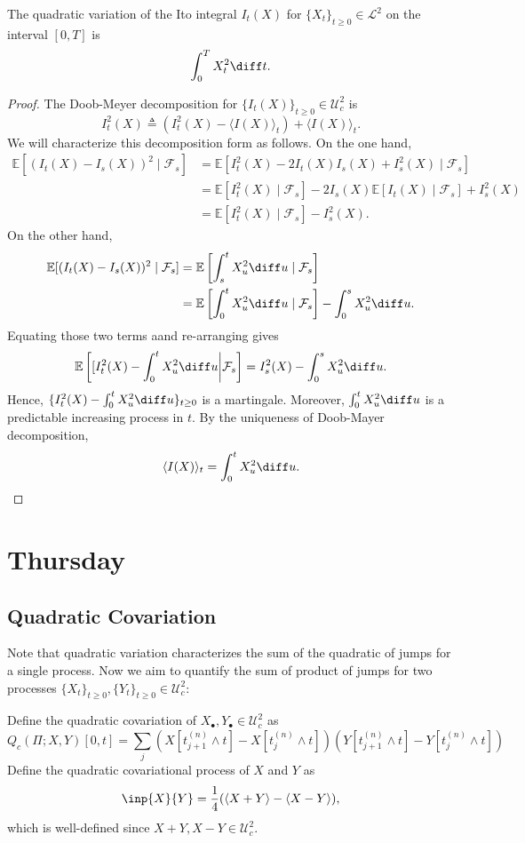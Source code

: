 \begin{theorem}
The quadratic variation of the Ito integral $I_t(X)$ for $\{X_t\}_{t\ge0}\in\mathcal{L}^2$ on the interval $[0,T]$ is
\[
\int_0^TX_t^2\diff t.
\]
\end{theorem}
\begin{proof}
The Doob-Meyer decomposition for $\{I_t(X)\}_{t\ge0}\in\mathcal{U}_c^2$ is
\[
I_t^2(X)\triangleq (I_t^2(X)-\langle I(X)\rangle_t) + \langle I(X)\rangle_t.
\]
We will characterize this decomposition form as follows.
On the one hand,
\begin{align*}
\mathbb{E}[(I_t(X)-I_s(X))^2\mid\mathcal{F}_s]&=\mathbb{E}[I_t^2(X)-2I_t(X)I_s(X)+I_s^2(X)\mid\mathcal{F}_s]\\
&=\mathbb{E}[I_t^2(X)\mid \mathcal{F}_s]-2I_s(X)\mathbb{E}[I_t(X)\mid \mathcal{F}_s]+I_s^2(X)\\
&=\mathbb{E}[I_t^2(X)\mid \mathcal{F}_s]-I_s^2(X).
\end{align*}
On the other hand,
\begin{align*}
\mathbb{E}[(I_t(X)-I_s(X))^2\mid\mathcal{F}_s]&=\mathbb{E}\left[\int_s^tX_u^2\diff u\mid\mathcal{F}_s\right]\\
&=\mathbb{E}\left[\int_0^tX_u^2\diff u\mid\mathcal{F}_s\right]-\int_0^sX_u^2\diff u.
\end{align*}
Equating those two terms aand re-arranging gives
\[
\mathbb{E}\left[
[I_t^2(X) - \int_0^tX_u^2\diff u\middle|\mathcal{F}_s
\right]
=
I_s^2(X)-\int_0^sX_u^2\diff u.
\]
Hence, $\{I_t^2(X)-\int_0^tX_u^2\diff u\}_{t\ge0}$ is a martingale.
Moreover, $\int_0^tX_u^2\diff u$ is a predictable increasing process in $t$.
By the uniqueness of Doob-Mayer decomposition,
\[
\langle I(X)\rangle_t=\int_0^tX_u^2\diff u.
\]

\end{proof}

\section{Thursday}
\subsection{Quadratic Covariation}

Note that quadratic variation characterizes the sum of the quadratic of jumps for a single process.
Now we aim to quantify the sum of product of jumps for two processes $\{X_t\}_{t\ge0}, \{Y_t\}_{t\ge0}\in\mathcal{U}_c^2$:
\begin{definition}
Define the quadratic covariation of $X_{\bullet}, Y_{\bullet}\in\mathcal{U}_c^2$ as
\[
Q_c(\Pi;X,Y)[0,t]=\sum_j\left(
X[t_{j+1}^{(n)}\land t] - X[t_{j}^{(n)}\land t]
\right)
\left(
Y[t_{j+1}^{(n)}\land t] - Y[t_{j}^{(n)}\land t]
\right)
\] 
Define the quadratic covariational process of $X$ and $Y$ as
\[
\inp{X}{Y}=\frac{1}{4}(\langle X+Y\rangle - \langle X-Y\rangle),
\]
which is well-defined since $X+Y,X-Y\in\mathcal{U}_c^2$.
\end{definition}

